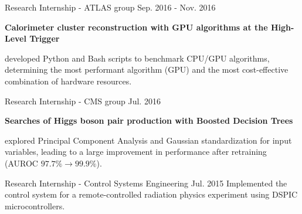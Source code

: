 \begin{cventries}

    {Research Internship - ATLAS group}
    {}
    {Sep. 2016 - Nov. 2016}
    {   
        \textbf{Calorimeter cluster reconstruction with GPU algorithms at the High-Level Trigger}\vspace{14pt}
        \begin{cvitems}
            \item {developed Python and Bash scripts to benchmark CPU/GPU algorithms, determining the most performant algorithm (GPU) and the most cost-effective combination of hardware resources.}
        \end{cvitems}
    }

    {Research Internship - CMS group}
    {}
    {Jul. 2016}
    {
        \textbf{Searches of Higgs boson pair production with Boosted Decision Trees}\vspace{14pt}
        \begin{cvitems}
            \item {explored Principal Component Analysis and Gaussian standardization for input variables, leading to a large improvement in performance after retraining (AUROC $97.7\% \to 99.9\%$).}
        \end{cvitems}
    }

    {Research Internship - Control Systems Engineering}
    {}
    {Jul. 2015}
    {Implemented the control system for a remote-controlled radiation physics experiment using DSPIC microcontrollers.}

\end{cventries}
